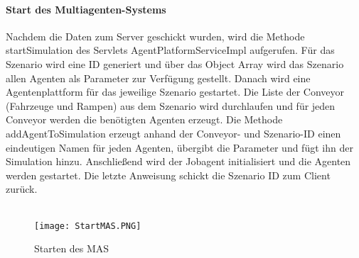 \paragraph{Start des Multiagenten-Systems}
Nachdem die Daten zum Server geschickt wurden, wird die Methode startSimulation des Servlets AgentPlatformServiceImpl aufgerufen. Für das Szenario wird eine ID generiert und über das Object Array wird das Szenario allen Agenten als Parameter zur Verfügung gestellt. Danach wird eine Agentenplattform für das jeweilige Szenario gestartet. Die Liste der Conveyor (Fahrzeuge und Rampen) aus dem Szenario wird durchlaufen und für jeden Conveyor werden die benötigten Agenten erzeugt. Die Methode addAgentToSimulation erzeugt anhand der Conveyor- und Szenario-ID einen eindeutigen Namen für jeden Agenten, übergibt die Parameter und fügt ihn der Simulation hinzu. Anschließend wird der Jobagent initialisiert und die Agenten werden gestartet. Die letzte Anweisung schickt die Szenario ID zum Client zurück.
\\\\  
\begin{figure}[h!]
	\centering
		\texttt{[image: StartMAS.PNG]}        
		\caption{Starten des MAS}
	\label{SMAS}
\end{figure}
\\\\
